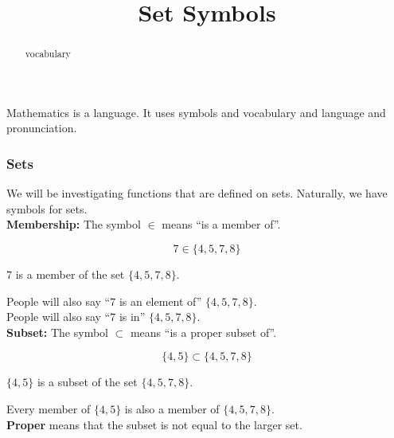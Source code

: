\documentclass{ximera}
\title{Set Symbols}
\begin{document}
\begin{abstract}
vocabulary
\end{abstract}
\maketitle




Mathematics is a language.  It uses symbols and vocabulary and language and pronunciation. \\




\subsubsection*{Sets}



We will be investigating functions that are defined on sets. Naturally, we have symbols for sets. \\



\textbf{\textcolor{blue!55!black}{Membership:}}  The symbol $\in$ means ``is a member of''.


\[
7 \in \{ 4, 5, 7, 8 \}
\]

\begin{center}

$7$ is a member of the set $\{ 4, 5, 7, 8 \}$.

\end{center}

People will also say ``$7$ is an element of'' $\{ 4, 5, 7, 8 \}$. \\

People will also say ``$7$ is in'' $\{ 4, 5, 7, 8 \}$. \\



\textbf{\textcolor{blue!55!black}{Subset:}}  The symbol $\subset$ means ``is a proper subset of''.


\[
\{ 4, 5 \} \subset \{ 4, 5, 7, 8 \}
\]

\begin{center}

$\{ 4, 5 \}$ is a subset of the set $\{ 4, 5, 7, 8 \}$.

\end{center}


Every member of $\{ 4, 5 \}$ is also a member of $\{ 4, 5, 7, 8 \}$. \\


\textbf{Proper} means that the subset is not equal to the larger set. \\
\end{document}

